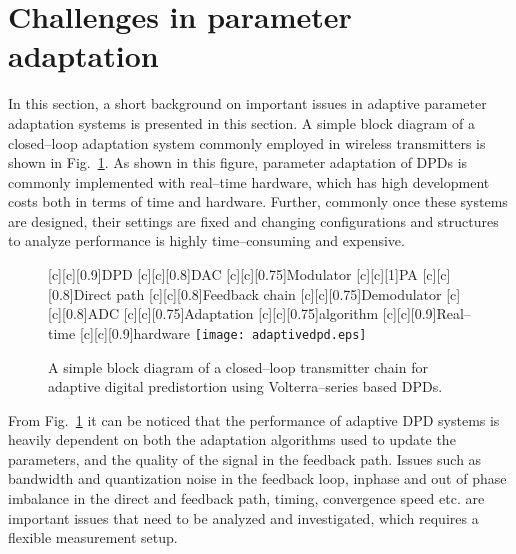 \documentclass[journal]{IEEEtran}
\begin{document}
\section{Challenges in parameter adaptation}

In this section, a short background on important issues in adaptive parameter adaptation systems is presented in this section. A simple block diagram of a closed--loop adaptation system commonly employed in wireless transmitters is shown in Fig.~\ref{setup}. As shown in this figure, parameter adaptation of DPDs is commonly implemented with real--time hardware, which has high development costs both in terms of time and hardware. Further, commonly once these systems are designed, their settings are fixed and changing configurations and structures to analyze performance is highly time--consuming and expensive.

\begin{figure}
\centering
{}[c][c][0.9]{DPD} [c][c][0.8]{DAC} [c][c][0.75]{Modulator} [c][c][1]{PA} [c][c][0.8]{Direct path} [c][c][0.8]{Feedback chain} [c][c][0.75]{Demodulator} [c][c][0.8]{ADC} [c][c][0.75]{Adaptation} [c][c][0.75]{algorithm} [c][c][0.9]{Real--time} [c][c][0.9]{hardware}
\texttt{[image: adaptivedpd.eps]}
\caption{A simple block diagram of a closed--loop transmitter chain for adaptive digital predistortion using Volterra--series based DPDs.}
\label{setup}
\end{figure}

From Fig.~\ref{setup} it can be noticed that the performance of adaptive DPD systems is heavily dependent on both the adaptation algorithms used to update the parameters, and the quality of the signal in the feedback path. Issues such as bandwidth and quantization noise in the feedback loop, inphase and out of phase imbalance in the direct and feedback path, timing, convergence speed etc. are important issues that need to be analyzed and investigated, which requires a flexible measurement setup.
\end{document}
